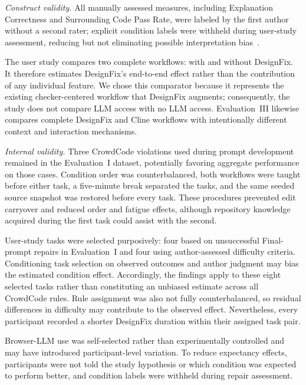 \textit{Construct validity.}
All manually assessed measures, including Explanation Correctness and Surrounding Code Pass Rate, were labeled by the first author without a second rater; explicit
condition labels were withheld during user-study assessment, reducing
but not eliminating possible interpretation bias~\cite{mcdonald2019reliability}.

The user study compares two complete workflows: with and without
DesignFix. It therefore estimates DesignFix's end-to-end effect rather than the contribution of any individual feature. We chose this comparator because it represents the existing
checker-centered workflow that DesignFix augments; consequently, the study does not compare LLM access with no LLM access. Evaluation~III likewise compares complete DesignFix and
Cline workflows with intentionally different context and interaction mechanisms.

\textit{Internal validity.}
Three CrowdCode violations used during prompt development remained in
the Evaluation~I dataset, potentially favoring aggregate performance
on those cases. Condition order was counterbalanced, both workflows
were taught before either task, a five-minute break separated the
tasks, and the same seeded source snapshot was restored before every
task. These procedures prevented edit carryover and reduced order and
fatigue effects, although repository knowledge acquired during the
first task could assist with the second.

User-study tasks were selected purposively: four based on unsuccessful
Final-prompt repairs in Evaluation~I and four using author-assessed
difficulty criteria. Conditioning task selection on observed outcomes
and author judgment may bias the estimated condition effect.
Accordingly, the findings apply to these eight selected tasks rather
than constituting an unbiased estimate across all CrowdCode rules.
Rule assignment was also not fully counterbalanced, so residual
differences in difficulty may contribute to the observed effect.
Nevertheless, every participant recorded a shorter DesignFix duration
within their assigned task pair.

Browser-LLM use was self-selected rather than experimentally
controlled and may have introduced participant-level variation. To
reduce expectancy effects, participants were not told the study
hypothesis or which condition was expected to perform better, and
condition labels were withheld during repair assessment.

